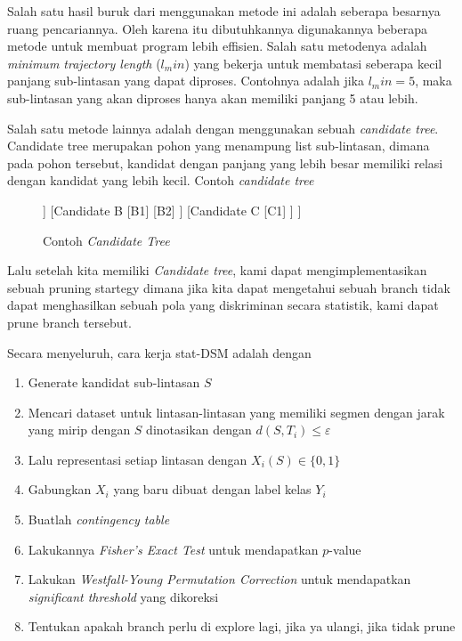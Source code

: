 \documentclass[a4paper,twoside]{article}
\begin{document}
Salah satu hasil buruk dari menggunakan metode ini adalah seberapa besarnya ruang pencariannya.
Oleh karena itu dibutuhkannya digunakannya beberapa metode untuk membuat program lebih effisien.
Salah satu metodenya adalah \textit{minimum trajectory length} ($l_min$) yang bekerja untuk membatasi seberapa kecil panjang sub-lintasan yang dapat diproses.
Contohnya adalah jika $l_min = 5$, maka sub-lintasan yang akan diproses hanya akan memiliki panjang 5 atau lebih.

Salah satu metode lainnya adalah dengan menggunakan sebuah \textit{candidate tree}.
Candidate tree merupakan pohon yang menampung list sub-lintasan, dimana pada pohon tersebut, kandidat dengan panjang yang lebih besar memiliki relasi dengan kandidat yang lebih kecil.
Contoh \textit{candidate tree}
\begin{figure}[h]
	\centering
	\begin{forest}
		[Candidate 1
			[Candidate A
				[A1]
				[A2]
				[A3]
			]
			[Candidate B
				[B1]
				[B2]
			]
			[Candidate C
				[C1]
			]
		]
	\end{forest}
	\caption{Contoh \textit{Candidate Tree}}
\end{figure}

Lalu setelah kita memiliki \textit{Candidate tree}, kami dapat mengimplementasikan sebuah pruning startegy dimana jika kita dapat mengetahui sebuah branch tidak dapat menghasilkan sebuah pola yang diskriminan secara statistik, kami dapat prune branch tersebut.

Secara menyeluruh, cara kerja stat-DSM adalah dengan
\begin{enumerate}
	\item Generate kandidat sub-lintasan $S$
	\item Mencari dataset untuk lintasan-lintasan yang memiliki segmen dengan jarak yang mirip dengan $S$ dinotasikan dengan $d(S,T_i)\leq\varepsilon$
	\item Lalu representasi setiap lintasan dengan $X_i(S)\in\{0,1\}$
	\item Gabungkan $X_i$ yang baru dibuat dengan label kelas $Y_i$
	\item Buatlah \textit{contingency table}
	\item Lakukannya \textit{Fisher's Exact Test} untuk mendapatkan $p$-value
	\item Lakukan \textit{Westfall-Young Permutation Correction} untuk mendapatkan \textit{significant threshold} yang dikoreksi
	\item Tentukan apakah branch perlu di explore lagi, jika ya ulangi, jika tidak prune
\end{enumerate}
\end{document}
